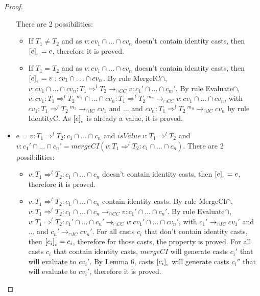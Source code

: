 \documentclass[a4paper]{article}
\begin{document}
\begin{proof}
\begin{itemize}
    There are 2 possibilities:
    \begin{itemize}
        \item If $T_1 \neq T_2$ and as $v : cv_1 \cap \ldots \cap cv_n$ doesn't contain identity casts, then $[e]_{_e} = e$, therefore it is proved.
        \item If $T_1 = T_2$ and as $v : cv_1 \cap \ldots \cap cv_n$ doesn't contain identity casts, then $[e]_{_e} = v : cv_1 \cap \ldots \cap cv_n$.
        By rule MergeIC$\cap$, $v : cv_1 \cap \ldots \cap cv_n : T_1 \Rightarrow^l T_2 \longrightarrow_{\cap CC} v : c_1' \cap \ldots \cap c_m'$.
        By rule Evaluate$\cap$, $v : cv_1 : T_1 \Rightarrow^l T_2\ ^{m_1} \cap \ldots \cap cv_n : T_1 \Rightarrow^l T_2\ ^{m_n} \longrightarrow_{\cap CC} v : cv_1 \cap \ldots \cap cv_n$, with $cv_1 : T_1 \Rightarrow^l T_2\ ^{m_1} \longrightarrow_{\cap IC} cv_1$ and ... and $cv_n : T_1 \Rightarrow^l T_2\ ^{m_n} \longrightarrow_{\cap IC} cv_n$ by rule IdentityC.
        As $[e]_{_e}$ is already a value, it is proved.
    \end{itemize}
    \item e = $v : T_1 \Rightarrow^l T_2 : c_1 \cap \ldots \cap c_n$ and $isValue\ v : T_1 \Rightarrow^l T_2$ and $v : c_1' \cap \ldots \cap c_n' = mergeCI (v : T_1 \Rightarrow^l T_2 : c_1 \cap \ldots \cap c_n)$.
    There are 2 possibilities:
    \begin{itemize}
        \item $v : T_1 \Rightarrow^l T_2 : c_1 \cap \ldots \cap c_n$ doesn't contain identity casts, then $[e]_{_e} = e$, therefore it is proved.
        \item $v : T_1 \Rightarrow^l T_2 : c_1 \cap \ldots \cap c_n$ contain identity casts.
        By rule MergeCI$\cap$, $v : T_1 \Rightarrow^l T_2 : c_1 \cap \ldots \cap c_n \longrightarrow_{\cap CC} v : c_1' \cap \ldots \cap c_n'$.
        By rule Evaluate$\cap$, $v : T_1 \Rightarrow^l T_2 : c_1' \cap \ldots \cap c_n' \longrightarrow_{\cap CC} v : cv_1' \cap \ldots \cap cv_n'$, with $c_1' \longrightarrow_{\cap IC} cv_1'$ and ... and $c_n' \longrightarrow_{\cap IC} cv_n'$.
        For all casts $c_i$ that don't contain identity casts, then $[c_i]_{_c} = c_i$, therefore for those casts, the property is proved.
        For all casts $c_i$ that contain identity casts, $mergeCI$ will generate casts $c_i'$ that will evaluate to $cv_i'$.
        By Lemma 6, casts $[c_i]_{_c}$ will generate casts $c_i''$ that will evaluate to $cv_i'$, therefore it is proved.
    \end{itemize}

\end{itemize}
\end{proof}
\end{document}
